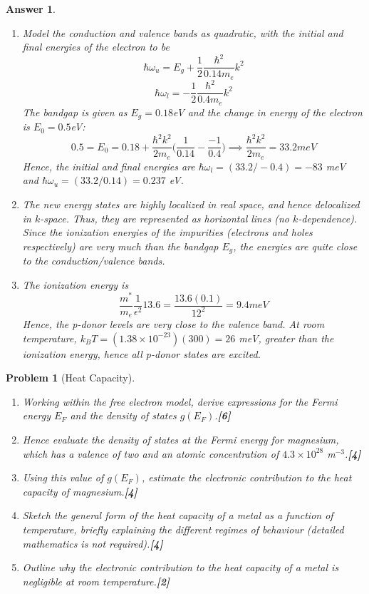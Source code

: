 \documentclass[a4paper]{article}
\newtheorem{ans}{Answer}[subsection]
\theoremstyle{new}
\newtheorem{qns}{Problem}[subsection]
\begin{document}
\begin{ans}
\begin{enumerate}[label=(\roman*)]
\item Model the conduction and valence bands as quadratic, with the initial and final energies of the electron to be
$$\hbar\omega_u=E_g+\frac{1}{2}\frac{\hbar^2}{0.14m_e}k^2$$
$$\hbar\omega_l=-\frac{1}{2}\frac{\hbar^2}{0.4m_e}k^2$$
The bandgap is given as $E_g=0.18$eV and the change in energy of the electron is $E_0=0.5$eV:
$$0.5=E_0=0.18+\frac{\hbar^2k^2}{2m_e}\bigg(\frac{1}{0.14}-\frac{-1}{0.4}\bigg)\implies\frac{\hbar^2k^2}{2m_e}=33.2meV$$
Hence, the initial and final energies are $\hbar\omega_l=(33.2/-0.4)=-83$ meV and $\hbar\omega_u=(33.2/0.14)=0.237$ eV.
\item The new energy states are highly localized in real space, and hence delocalized in $k$-space. Thus, they are represented as horizontal lines (no $k$-dependence). Since the ionization energies of the impurities (electrons and holes respectively) are very much than the bandgap $E_g$, the energies are quite close to the conduction/valence bands. 
\item The ionization energy is
$$\frac{m^*}{m_e}\frac{1}{\epsilon^2}13.6=\frac{13.6(0.1)}{12^2}=9.4meV$$
Hence, the p-donor levels are very close to the valence band. At room temperature, $k_BT=(1.38\times10^{-23})(300)=26$ meV, greater than the ionization energy, hence all p-donor states are excited.
\end{enumerate}
\end{ans}
\begin{qns}[Heat Capacity]\leavevmode
\begin{enumerate}[label=(\roman*)]
\item Working within the free electron model, derive expressions for the Fermi energy $E_F$ and the density of states $g(E_F)$.\hfill\textbf{[6]}
\item Hence evaluate the density of states at the Fermi energy for magnesium, which has a valence of two and an atomic concentration of $4.3\times 10^{28}$ m$^{−3}$.\hfill\textbf{[4]}
\item Using this value of $g(E_F)$, estimate the electronic contribution to the heat capacity of magnesium.\hfill\textbf{[4]}
\item Sketch the general form of the heat capacity of a metal as a function of temperature, briefly explaining the different regimes of behaviour (detailed mathematics is not required).\hfill\textbf{[4]}
\item Outline why the electronic contribution to the heat capacity of a metal is negligible at room temperature.\hfill\textbf{[2]}
\end{enumerate}
\end{qns}
\end{document}
